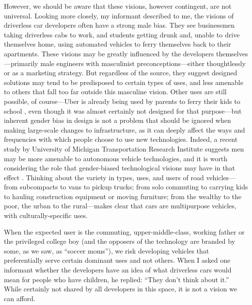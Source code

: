 However, we should be aware that these visions, however contingent,
are not universal. Looking more closely, my informant described to me, the visions
of driverless car developers
often have a strong male bias. They see businessmen
taking driverless cabs to work, and students getting drunk and, unable
to drive themselves home, using automated vehicles to ferry themselves
back to their apartments. These visions may be greatly influenced by
the developers themselves---primarily male engineers with masculinist
preconceptions---either thoughtlessly or as a marketing strategy. But
regardless of the source, they suggest designed solutions may tend to
be predisposed to certain types of uses, and less amenable to others
that fall too far outside this masculine vision. Other uses are still
possible, of course---Uber is already being used by parents to ferry
their kids to school \cite{hoderParents} \cite{shapiroVan}, even
though it was almost certainly not designed 
for that
purpose---but inherent gender bias in design is not a problem that should be ignored
when making large-scale changes to infrastructure, as it can deeply
affect the ways and frequencies with which people choose to use new
technologies. Indeed, a recent study by University of Michigan
Transportation Research Institute suggests men may be more
amenable to autonomous vehicle technologies, and it is worth
considering the role that gender-biased technological visions may have
in that
effect \cite{miglioreWomen}.
Thinking about the variety in types, uses, and users of road vehicles---from
subcompacts to vans to pickup trucks; from solo commuting to carrying kids to
hauling construction equipment or moving furniture; from the wealthy
to the poor, the urban to the rural---makes clear that cars are
multipurpose vehicles, with culturally-specific uses. 


When the
expected user is the commuting, upper-middle-class, working father or
the privileged college boy (and the opposers of the technology are
branded by some, as we saw, as ``soccer moms''), we risk developing
vehicles that preferentially serve certain dominant uses and not
others. When I asked one informant whether the developers have an idea
of what driverless cars would mean for people who have children, he
replied:  ``They don't think about it.'' While certainly not shared by
all developers in this space, it is not a vision we can afford.

